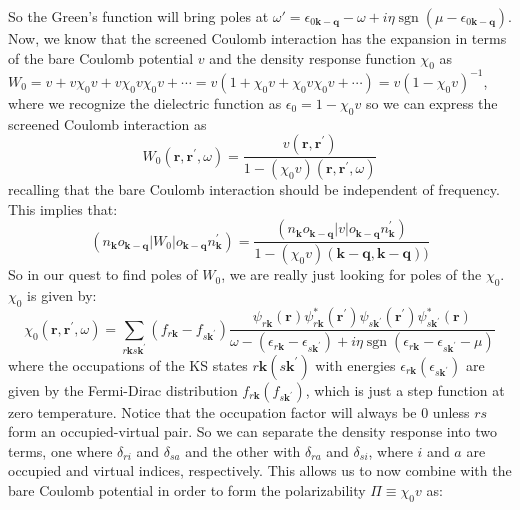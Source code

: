 \documentclass[12pt]{article}
\begin{document}
    So the Green's function will bring poles at \(\omega' = \epsilon_{0 \mathbf{k-q}} - \omega+ i\eta\operatorname{sgn}(\mu - \epsilon_{0 \mathbf{k-q}})\).
    Now, we know that the screened Coulomb interaction has the expansion in terms of the bare Coulomb potential \(v\) and the density response function \(\chi_0\) as \(W_0 = v + v\chi_0 v + v\chi_0 v\chi_0 v + \cdots = v\left(1 + \chi_0 v + \chi_0 v \chi_0 v + \cdots\right) = v\left(1 - \chi_0 v\right)^{-1}\), where we recognize the dielectric function as \(\epsilon_0 = 1 - \chi_0 v\) so we can express the screened Coulomb interaction as
    \begin{equation}
    W_0(\mathbf{r}, \mathbf{r}^{\prime}, \omega) = \frac{v(\mathbf{r}, \mathbf{r}^{\prime})}{1 - \left(\chi_0v\right)(\mathbf{r}, \mathbf{r}^{\prime}, \omega)}
    \end{equation}
    recalling that the bare Coulomb interaction should be independent of frequency. This implies that: 
\begin{equation}
    (n_{\mathbf{k}}o_{\mathbf{k-q}}|W_0|o_{\mathbf{k-q}}n^\prime_{\mathbf{k}}) = \frac{(n_{\mathbf{k}}o_{\mathbf{k-q}}|v|o_{\mathbf{k-q}}n^\prime_{\mathbf{k}})}{1 - \left(\chi_0v\right)(\mathbf{k}-\mathbf{q},\mathbf{k}-\mathbf{q}))}
\end{equation}
    So in our quest to find poles of $W_0$, we are really just looking for poles of the $\chi_0$. $\chi_0$ is given by:
    \begin{equation}
    \chi_{0}\left(\mathbf{r}, \mathbf{r}^{\prime}, \omega\right)=\sum_{r\mathbf{k} s \mathbf{k}^{\prime}}\left(f_{r \mathbf{k}}-f_{s \mathbf{k}^{\prime}}\right) \frac{\psi_{r \mathbf{k}}(\mathbf{r}) \psi_{r \mathbf{k}}^{*}\left(\mathbf{r}^{\prime}\right) \psi_{s \mathbf{k}^{\prime}}\left(\mathbf{r}^{\prime}\right) \psi_{s \mathbf{k}^{\prime}}^{*}(\mathbf{r})}{\omega-\left(\epsilon_{r \mathbf{k}}-\epsilon_{s \mathbf{k}^{\prime}}\right)+i \eta \operatorname{sgn}\left(\epsilon_{r \mathbf{k}}-\epsilon_{s \mathbf{k}^{\prime} } - \mu\right)}
    \end{equation}
    where the occupations of the KS states \(r\mathbf{k}(s\mathbf{k}^{\prime})\) with energies \(\epsilon_{r\mathbf{k}}(\epsilon_{s\mathbf{k}^{\prime}})\) are given by the Fermi-Dirac distribution \(f_{r\mathbf{k}}(f_{s\mathbf{k}^{\prime}})\), which is just a step function at zero temperature. Notice that the occupation factor will always be 0 unless \(rs\) form an occupied-virtual pair. So we can separate the density response into two terms, one where \(\delta_{ri}\) and \(\delta_{sa}\) and the other with \(\delta_{ra}\) and \(\delta_{si}\), where \(i\) and \(a\) are occupied and virtual indices, respectively. This allows us to now combine with the bare Coulomb potential in order to form the polarizability $\Pi\equiv \chi_0v$ as:
\end{document}
